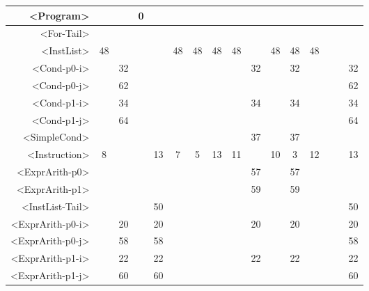 \begin{tabular}{r|c@{ }c@{ }c@{ }c@{ }c@{ }c@{ }c@{ }c@{ }c@{ }c@{ }c@{ }c@{ }c@{ }c@{ }c@{ }}
<Program> &   &   & 0 &   &   &   &   &   &   &   &   &   &   &   &   \\\hline
<For-Tail> &   &   &   &   &   &   &   &   &   &   &   &   &   &   &   \\\hline
<InstList> & 48 &   &   &   & 48 & 48 & 48 & 48 &   & 48 & 48 & 48 &   &   &   \\\hline
<Cond-p0-i> &   & 32 &   &   &   &   &   &   & 32 &   & 32 &   &   &   & 32 \\\hline
<Cond-p0-j> &   & 62 &   &   &   &   &   &   &   &   &   &   &   &   & 62 \\\hline
<Cond-p1-i> &   & 34 &   &   &   &   &   &   & 34 &   & 34 &   &   &   & 34 \\\hline
<Cond-p1-j> &   & 64 &   &   &   &   &   &   &   &   &   &   &   &   & 64 \\\hline
<SimpleCond> &   &   &   &   &   &   &   &   & 37 &   & 37 &   &   &   &   \\\hline
<Instruction> & 8 &   &   & 13 & 7 & 5 & 13 & 11 &   & 10 & 3 & 12 &   &   & 13 \\\hline
<ExprArith-p0> &   &   &   &   &   &   &   &   & 57 &   & 57 &   &   &   &   \\\hline
<ExprArith-p1> &   &   &   &   &   &   &   &   & 59 &   & 59 &   &   &   &   \\\hline
<InstList-Tail> &   &   &   & 50 &   &   &   &   &   &   &   &   &   &   & 50 \\\hline
<ExprArith-p0-i> &   & 20 &   & 20 &   &   &   &   & 20 &   & 20 &   &   &   & 20 \\\hline
<ExprArith-p0-j> &   & 58 &   & 58 &   &   &   &   &   &   &   &   &   &   & 58 \\\hline
<ExprArith-p1-i> &   & 22 &   & 22 &   &   &   &   & 22 &   & 22 &   &   &   & 22 \\\hline
<ExprArith-p1-j> &   & 60 &   & 60 &   &   &   &   &   &   &   &   &   &   & 60 \\\hline
\end{tabular}



